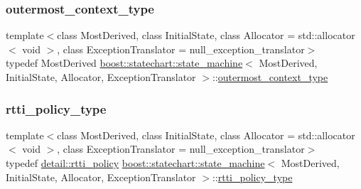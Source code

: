 \subsubsection{\texorpdfstring{outermost\+\_\+context\+\_\+type}{outermost\_context\_type}}
{\footnotesize\ttfamily template$<$class Most\+Derived, class Initial\+State, class Allocator = std\+::allocator$<$ void $>$, class Exception\+Translator = null\+\_\+exception\+\_\+translator$>$ \\
typedef Most\+Derived \mbox{\hyperlink{classboost_1_1statechart_1_1state__machine}{boost\+::statechart\+::state\+\_\+machine}}$<$ Most\+Derived, Initial\+State, Allocator, Exception\+Translator $>$\+::\mbox{\hyperlink{classboost_1_1statechart_1_1state__machine_a3c047829e797a9501c7d69151d17e368}{outermost\+\_\+context\+\_\+type}}}

\mbox{\label{classboost_1_1statechart_1_1state__machine_af2a620c579a5248103aee4d3ccb4d632}} 
\subsubsection{\texorpdfstring{rtti\+\_\+policy\+\_\+type}{rtti\_policy\_type}}
{\footnotesize\ttfamily template$<$class Most\+Derived, class Initial\+State, class Allocator = std\+::allocator$<$ void $>$, class Exception\+Translator = null\+\_\+exception\+\_\+translator$>$ \\
typedef \mbox{\hyperlink{structboost_1_1statechart_1_1detail_1_1rtti__policy}{detail\+::rtti\+\_\+policy}} \mbox{\hyperlink{classboost_1_1statechart_1_1state__machine}{boost\+::statechart\+::state\+\_\+machine}}$<$ Most\+Derived, Initial\+State, Allocator, Exception\+Translator $>$\+::\mbox{\hyperlink{classboost_1_1statechart_1_1state__machine_af2a620c579a5248103aee4d3ccb4d632}{rtti\+\_\+policy\+\_\+type}}}

\mbox{\label{classboost_1_1statechart_1_1state__machine_a2e31e5e73f5e9e5f3714b04eb11cda08}} 
